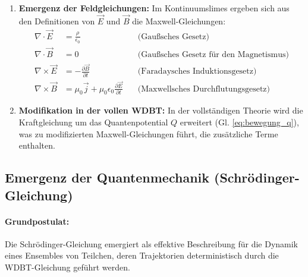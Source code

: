 \documentclass[11pt, a4paper]{article}
\begin{document}
\begin{enumerate}
    \item \textbf{Emergenz der Feldgleichungen:} Im Kontinuumslimes ergeben sich aus den Definitionen von $\vec{E}$ und $\vec{B}$ die Maxwell-Gleichungen:
    \begin{subequations}
    \begin{align}
    \nabla \cdot \vec{E} &= \frac{\rho}{\epsilon_0} \quad &\text{(Gaußsches Gesetz)} \\
    \nabla \cdot \vec{B} &= 0 \quad &\text{(Gaußsches Gesetz für den Magnetismus)} \\
    \nabla \times \vec{E} &= -\frac{\partial \vec{B}}{\partial t} \quad &\text{(Faradaysches Induktionsgesetz)} \\
    \nabla \times \vec{B} &= \mu_0 \vec{j} + \mu_0 \epsilon_0 \frac{\partial \vec{E}}{\partial t} \quad &\text{(Maxwellsches Durchflutungsgesetz)}
    \end{align}
    \end{subequations}
    \item \textbf{Modifikation in der vollen WDBT:} In der vollständigen Theorie wird die Kraftgleichung um das Quantenpotential $Q$ erweitert (Gl. \ref{eq:bewegung_q}), was zu modifizierten Maxwell-Gleichungen führt, die zusätzliche Terme enthalten.
\end{enumerate}

\subsection{Emergenz der Quantenmechanik (Schrödinger-Gleichung)}
\label{subsec:emergenz_qm}

\paragraph{Grundpostulat:} Die Schrödinger-Gleichung emergiert als effektive Beschreibung für die Dynamik eines Ensembles von Teilchen, deren Trajektorien deterministisch durch die WDBT-Gleichung geführt werden.
\end{document}
